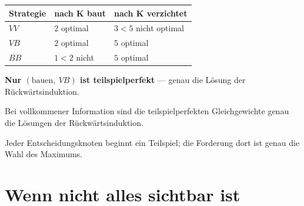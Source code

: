 \begin{merksatz}
\begin{center}
{\small
\renewcommand{\arraystretch}{1.5}
\begin{tabular}{@{}P{2.2cm}P{2.6cm}P{3.0cm}@{}}
\toprule
\textbf{Strategie} & \textbf{nach K baut} & \textbf{nach K verzichtet}\\
\midrule
$VV$ & $2$ \textcolor{gruen}{optimal} & $3 < 5$ \textcolor{akzent}{nicht optimal}\\
$VB$ & $2$ \textcolor{gruen}{optimal} & $5$ \textcolor{gruen}{optimal}\\
$BB$ & $1 < 2$ \textcolor{akzent}{nicht} & $5$ \textcolor{gruen}{optimal}\\
\bottomrule
\end{tabular}}
\end{center}

\begin{center}
\begin{minipage}{0.9\textwidth}
\textbf{Nur $(\text{bauen},\ VB)$ ist teilspielperfekt} --- genau die Lösung der Rückwärtsinduktion.
\end{minipage}
\end{center}

\begin{center}
\begin{minipage}{0.88\textwidth}
\end{minipage}
\end{center}

Bei vollkommener Information sind die teilspielperfekten Gleichgewichte genau die Lösungen der Rückwärtsinduktion.

 Jeder Entscheidungsknoten beginnt ein Teilspiel; die Forderung dort ist genau die Wahl des Maximums.
\end{merksatz}

\section{Wenn nicht alles sichtbar ist}

